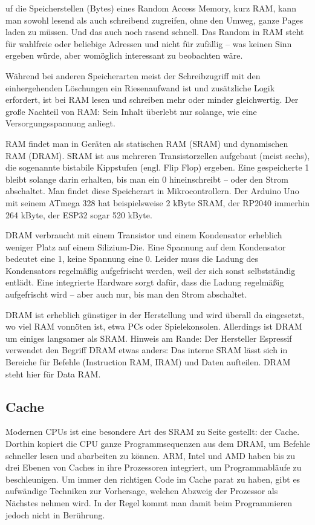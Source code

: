 uf die Speicherstellen (Bytes) eines Random Access Memory, kurz RAM, kann man sowohl lesend als auch schreibend zugreifen, ohne den Umweg, ganze Pages laden zu müssen. Und das auch noch rasend schnell. Das Random in RAM steht für wahlfreie oder beliebige Adressen und nicht für zufällig – was keinen Sinn ergeben würde, aber womöglich interessant zu beobachten wäre.

Während bei anderen Speicherarten meist der Schreibzugriff mit den einhergehenden Löschungen ein Riesenaufwand ist und zusätzliche Logik erfordert, ist bei RAM lesen und schreiben mehr oder minder gleichwertig. Der große Nachteil von RAM: Sein Inhalt überlebt nur solange, wie eine Versorgungsspannung anliegt.

RAM findet man in Geräten als statischen RAM (SRAM) und dynamischen RAM (DRAM). SRAM ist aus mehreren Transistorzellen aufgebaut (meist sechs), die sogenannte bistabile Kippstufen (engl. Flip Flop) ergeben. Eine gespeicherte 1 bleibt solange darin erhalten, bis man ein 0 hineinschreibt – oder den Strom abschaltet. Man findet diese Speicherart in Mikrocontrollern. Der Arduino Uno mit seinem ATmega 328 hat beispielsweise 2 kByte SRAM, der RP2040 immerhin 264 kByte, der ESP32 sogar 520 kByte.

DRAM verbraucht mit einem Transistor und einem Kondensator erheblich weniger Platz auf einem Silizium-Die. Eine Spannung auf dem Kondensator bedeutet eine 1, keine Spannung eine 0. Leider muss die Ladung des Kondensators regelmäßig aufgefrischt werden, weil der sich sonst selbstständig entlädt. Eine integrierte Hardware sorgt dafür, dass die Ladung regelmäßig aufgefrischt wird – aber auch nur, bis man den Strom abschaltet.

DRAM ist erheblich günstiger in der Herstellung und wird überall da eingesetzt, wo viel RAM vonnöten ist, etwa PCs oder Spielekonsolen. Allerdings ist DRAM um einiges langsamer als SRAM. Hinweis am Rande: Der Hersteller Espressif verwendet den Begriff DRAM etwas anders: Das interne SRAM lässt sich in Bereiche für Befehle (Instruction RAM, IRAM) und Daten aufteilen. DRAM steht hier für Data RAM.

\subsection{Cache}

Modernen CPUs ist eine besondere Art des SRAM zu Seite gestellt: der Cache. Dorthin kopiert die CPU ganze Programmsequenzen aus dem DRAM, um Befehle schneller lesen und abarbeiten zu können. ARM, Intel und AMD haben bis zu drei Ebenen von Caches in ihre Prozessoren integriert, um Programmabläufe zu beschleunigen. Um immer den richtigen Code im Cache parat zu haben, gibt es aufwändige Techniken zur Vorhersage, welchen Abzweig der Prozessor als Nächstes nehmen wird. In der Regel kommt man damit beim Programmieren jedoch nicht in Berührung.

